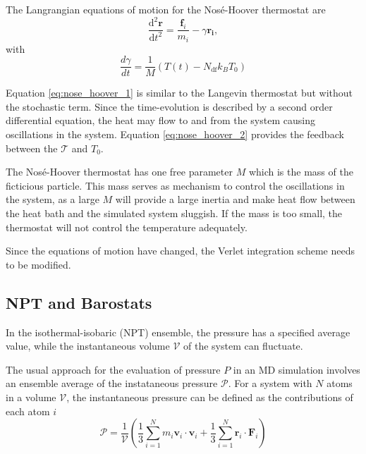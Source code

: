 The Langrangian equations of motion for the Nos\'e-Hoover thermostat are
\begin{equation}
  \label{eq:nose_hoover_1}
  \frac{\mathrm{d}^2 \bm{r} }
       {\mathrm{d} t^2 }
  =
  \frac{\bm{f}_i}
	     {m_i}
	- \gamma \bm{r_i},
\end{equation}
with
\begin{equation}
  \label{eq:nose_hoover_2}
  \frac{d\gamma}{dt}
  =
  \frac{1}{M}
   \left(
       T(t) - N_{\mathrm{df}} k_B T_0
   \right)
\end{equation}

Equation \ref{eq:nose_hoover_1} is similar to the Langevin thermostat but without the stochastic term.  Since the time-evolution is described by a second order differential equation, the heat may flow to and from the system causing oscillations in the system. Equation \ref{eq:nose_hoover_2} provides the feedback between the $\mathcal{T}$ and $T_0$.

The Nos\'e-Hoover thermostat has one free parameter $M$ which is the mass of the ficticious particle.  This mass serves as mechanism to control the oscillations in the system, as a large $M$ will provide a large inertia and make heat flow between the heat bath and the simulated system sluggish.  If the mass is too small, the thermostat will not control the temperature adequately.

Since the equations of motion have changed, the Verlet integration scheme needs to be modified.

\subsection{NPT and Barostats}
\label{sec:npt_ensemble}
In the isothermal-isobaric (NPT) ensemble, the pressure has a specified average value, while the instantaneous volume $\mathcal{V}$ of the system can fluctuate.

The usual approach for the evaluation of pressure $P$ in an MD simulation involves an ensemble average of the instataneous pressure $\mathcal{P}$\cite{allen1987_md}.  For a system with $N$ atoms in a volume $\mathcal{V}$, the instantaneous pressure can be defined as the contributions of each atom $i$
\begin{equation}
  \mathcal{P}
  =
  \frac{1}{\mathcal{V}}
  \left(
    \frac{1}{3}
    \sum_{i=1}^N m_i \bm{v}_i  \cdot \bm{v}_i
    +
    \frac{1}{3}
    \sum_{i=1}^N \bm{r}_i \cdot \bm{F}_i
  \right)
\end{equation}

